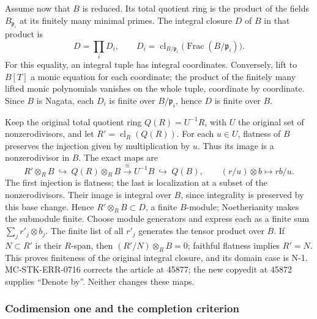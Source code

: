 Assume now that \(B\) is reduced. Its total quotient ring is the product of the fields \(B_{\mathfrak p_i}\) at its finitely many minimal primes. The integral closure \(D\) of \(B\) in that product is \[
 D=\prod_i D_i,\qquad
 D_i=\operatorname{cl}_{B/\mathfrak p_i}\bigl(\operatorname{Frac}(B/\mathfrak p_i)\bigr).
\] For this equality, an integral tuple has integral coordinates. Conversely, lift to \(B[T]\) a monic equation for each coordinate; the product of the finitely many lifted monic polynomials vanishes on the whole tuple, coordinate by coordinate. Since \(B\) is Nagata, each \(D_i\) is finite over \(B/\mathfrak p_i\), hence \(D\) is finite over \(B\).

Keep the original total quotient ring \(Q(R)=U^{-1}R\), with \(U\) the original set of nonzerodivisors, and let \(R'=\operatorname{cl}_R(Q(R))\). For each \(u\in U\), flatness of \(B\) preserves the injection given by multiplication by \(u\). Thus its image is a nonzerodivisor in \(B\). The exact maps are \[
 R'\otimes_R B\ \hookrightarrow\ Q(R)\otimes_R B
 \xrightarrow{\ \cong\ }U^{-1}B\ \hookrightarrow\ Q(B),
 \qquad (r/u)\otimes b\longmapsto rb/u.
\] The first injection is flatness; the last is localization at a subset of the nonzerodivisors. Their image is integral over \(B\), since integrality is preserved by this base change. Hence \(R'\otimes_R B\subset D\), a finite \(B\)-module; Noetherianity makes the submodule finite. Choose module generators and express each as a finite sum \(\sum_j r'_j\otimes b_j\). The finite list of all \(r'_j\) generates the tensor product over \(B\). If \(N\subset R'\) is their \(R\)-span, then \((R'/N)\otimes_R B=0\); faithful flatness implies \(R'=N\). This proves finiteness of the original integral closure, and its domain case is N-1. MC-STK-ERR-0716 corrects the article at 45877; the new copyedit at 45872 supplies ``Denote by''. Neither changes these maps.

\subsubsection{Codimension one and the completion criterion}\label{algebra-proof-067-codimension-one-and-the-completion-criterion}

